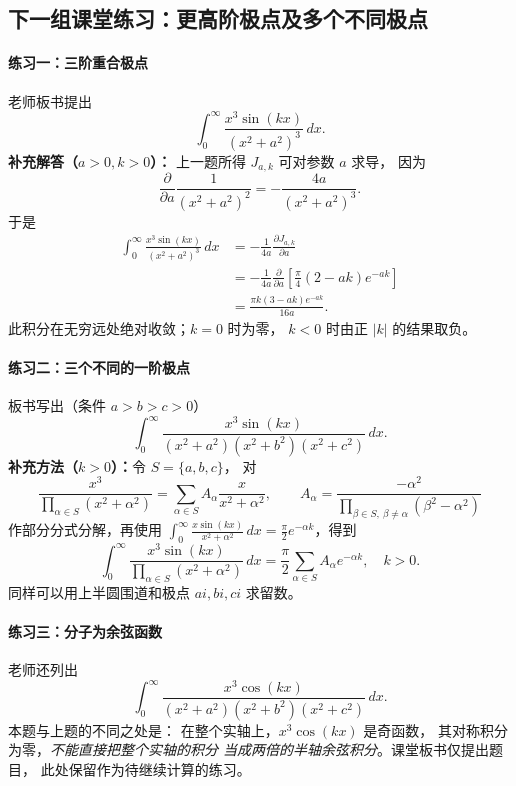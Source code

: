\subsection*{下一组课堂练习：更高阶极点及多个不同极点}
\paragraph{练习一：三阶重合极点}
老师板书提出
\[
 \int_0^\infty
    \frac{x^3\sin(kx)}{(x^2+a^2)^3}\,dx.
\]
\textbf{补充解答（$a>0,k>0$）：}
上一题所得 $J_{a,k}$ 可对参数 $a$ 求导，
因为
\[
 \frac{\partial}{\partial a}\frac{1}{(x^2+a^2)^2}
 =-\frac{4a}{(x^2+a^2)^3}.
\]
于是
\begin{align*}
 \int_0^\infty\frac{x^3\sin(kx)}{(x^2+a^2)^3}\,dx
 &=-\frac1{4a}\frac{\partial J_{a,k}}{\partial a}\\
 &=-\frac1{4a}\frac{\partial}{\partial a}
     \left[\frac{\pi}{4}(2-ak)e^{-ak}\right]\\
 &=\boxed{\frac{\pi k(3-ak)e^{-ak}}{16a}}.
\end{align*}
此积分在无穷远处绝对收敛；$k=0$ 时为零，
$k<0$ 时由正 $|k|$ 的结果取负。

\paragraph{练习二：三个不同的一阶极点}
板书写出（条件 $a>b>c>0$）
\[
 \int_0^\infty
 \frac{x^3\sin(kx)}
 {(x^2+a^2)(x^2+b^2)(x^2+c^2)}\,dx.
\]
\textbf{补充方法（$k>0$）：}令 $S=\{a,b,c\}$，
对
\[
 \frac{x^3}{\prod_{\alpha\in S}(x^2+\alpha^2)}
 =\sum_{\alpha\in S}
    A_\alpha\frac{x}{x^2+\alpha^2},
 \qquad
 A_\alpha=\frac{-\alpha^2}
 {\prod_{\beta\in S,\ \beta\ne\alpha}(\beta^2-\alpha^2)}
\]
作部分分式分解，再使用
$\int_0^\infty \frac{x\sin(kx)}{x^2+\alpha^2}\,dx
 =\frac{\pi}{2}e^{-\alpha k}$，得到
\[
 \boxed{
 \int_0^\infty
 \frac{x^3\sin(kx)}
 {\prod_{\alpha\in S}(x^2+\alpha^2)}\,dx
 =\frac{\pi}{2}\sum_{\alpha\in S}A_\alpha e^{-\alpha k},
 \quad k>0.
 }
\]
同样可以用上半圆围道和极点 $ai,bi,ci$ 求留数。

\paragraph{练习三：分子为余弦函数}
老师还列出
\[
 \int_0^\infty
 \frac{x^3\cos(kx)}
 {(x^2+a^2)(x^2+b^2)(x^2+c^2)}\,dx.
\]
本题与上题的不同之处是：
在整个实轴上，$x^3\cos(kx)$ 是奇函数，
其对称积分为零，\emph{不能直接把整个实轴的积分
当成两倍的半轴余弦积分}。课堂板书仅提出题目，
此处保留作为待继续计算的练习。
